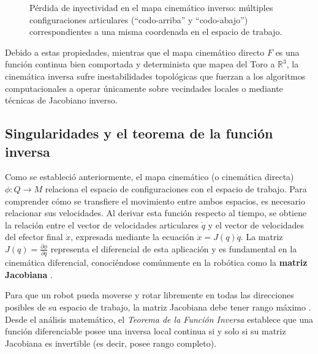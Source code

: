 \begin{figure}[htbp]
    \centering
    

    \caption{Pérdida de inyectividad en el mapa cinemático inverso: múltiples configuraciones articulares (\enquote{codo-arriba} y \enquote{codo-abajo}) correspondientes a una misma coordenada en el espacio de trabajo.}
    \label{fig:codo_arriba_abajo}
\end{figure}

Debido a estas propiedades, mientras que el mapa cinemático directo $F$ es una función continua 
bien comportada y determinista que mapea del Toro a $\mathbb{R}^3$, la cinemática inversa sufre 
inestabilidades topológicas que fuerzan a los algoritmos computacionales a operar únicamente 
sobre vecindades locales o mediante técnicas de Jacobiano inverso.

\subsection{Singularidades y el teorema de la función inversa}

Como se estableció anteriormente, el mapa cinemático (o cinemática directa) 
$\phi: Q \to M$ relaciona el espacio de configuraciones con el espacio de trabajo. 
Para comprender cómo se transfiere el movimiento entre ambos espacios, es necesario 
relacionar sus velocidades. Al derivar esta función respecto al tiempo, se obtiene la 
relación entre el vector de velocidades articulares $\dot{q}$ y el vector de velocidades 
del efector final $\dot{x}$, expresada mediante la ecuación $\dot{x} = J(q)\dot{q}$. 
La matriz $J(q) = \frac{\partial \phi}{\partial q}$ representa el diferencial de esta aplicación 
y es fundamental en la cinemática diferencial, conociéndose comúnmente en la robótica como la 
\textbf{matriz Jacobiana} \parencite{choset2005principles}. 

Para que un robot pueda moverse y rotar libremente en todas las direcciones posibles de su 
espacio de trabajo, la matriz Jacobiana debe tener rango máximo \parencite{lynch2017modern}. Desde el análisis matemático, 
el \textit{Teorema de la Función Inversa} establece que una función diferenciable posee una inversa 
local continua si y solo si su matriz Jacobiana es invertible (es decir, posee rango completo). 

